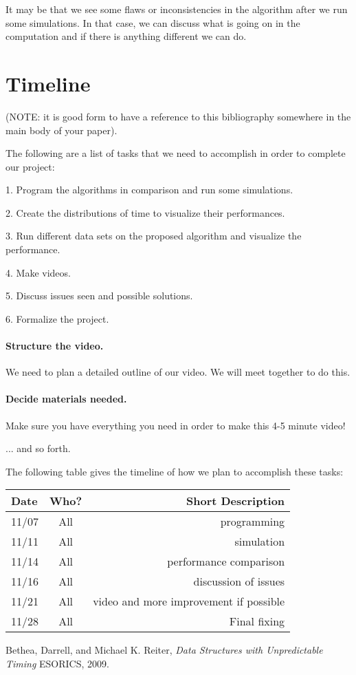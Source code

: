 \documentclass[11pt,twocolumn]{article}
\begin{document}
It may be that we see some flaws or inconsistencies in the algorithm after we run some simulations. In that case, we can discuss what is going on in the computation and if there is anything different we can do.



 

\newpage
\onecolumn
\appendix
\section{Timeline}
(NOTE: it is good form to have a reference to this bibliography somewhere in 
the main body of your paper).

The following are a list of tasks that we need to accomplish in order to 
complete our project:

1. Program the algorithms in comparison and run some simulations.

2. Create the distributions of time to visualize their performances.

3. Run different data sets on the proposed algorithm and visualize the performance.

4. Make videos.

5. Discuss issues seen and possible solutions.

6. Formalize the project.

\paragraph{Structure the video.} We need to plan a detailed outline of our 
video.  We will meet together to do this.

\paragraph{Decide materials needed.}  Make sure you have everything you need in 
order to make this 4-5 minute video!

... and so forth.

The following table gives the timeline of how we plan to accomplish these tasks:

\begin{table}[h!]
\centering
\begin{tabular}{ |l | c | r|}
  \hline
  Date & Who? & Short Description \\
  \hline
  \hline
  11/07 & All & programming \\
  \hline
  11/11 & All & simulation \\
  
  \hline
  11/14 & All & performance comparison \\
  
  \hline
  11/16 & All & discussion of issues \\
  
  \hline
  11/21 & All & video and more improvement if possible \\
  
 
  \hline
  11/28 & All & Final fixing \\
  \hline
\end{tabular}
\end{table}

\pagebreak

\begin{thebibliography}{9}
	
	Bethea, Darrell, and Michael K. Reiter,
	\emph{Data Structures with Unpredictable Timing}
	ESORICS,
	2009.
	
\end{thebibliography}
\end{document}
